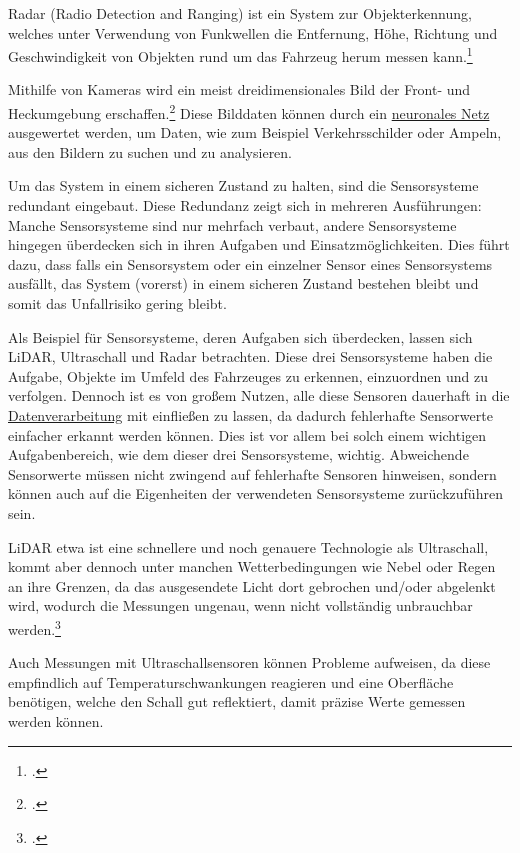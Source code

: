 \documentclass[a4paper, 12pt, openany]{book}
\begin{document}
                Radar (Radio Detection and Ranging) ist ein System zur Objekterkennung, welches unter Verwendung von Funkwellen die Entfernung, Höhe, Richtung und Geschwindigkeit von Objekten rund um das Fahrzeug herum messen kann.\footcite[37]{rathod2013autonomous}
                
                Mithilfe von Kameras wird ein meist dreidimensionales Bild der Front- und Heckumgebung erschaffen.\footcite[37]{rathod2013autonomous} Diese Bilddaten können durch ein \hyperref[dv]{neuronales Netz} ausgewertet werden, um Daten, wie zum Beispiel Verkehrsschilder oder Ampeln, aus den Bildern zu suchen und zu analysieren. 
                
                Um das System in einem sicheren Zustand zu halten, sind die Sensorsysteme redundant eingebaut. Diese Redundanz zeigt sich in mehreren Ausführungen: Manche Sensorsysteme sind nur mehrfach verbaut, andere Sensorsysteme hingegen überdecken sich in ihren Aufgaben und Einsatzmöglichkeiten. Dies führt dazu, dass falls ein Sensorsystem oder ein einzelner Sensor eines Sensorsystems ausfällt, das System (vorerst) in einem sicheren Zustand bestehen bleibt und somit das Unfallrisiko gering bleibt.  
                
                Als Beispiel für Sensorsysteme, deren Aufgaben sich überdecken, lassen sich LiDAR, Ultraschall und Radar betrachten. Diese drei Sensorsysteme haben die Aufgabe, Objekte im Umfeld des Fahrzeuges zu erkennen, einzuordnen und zu verfolgen. Dennoch ist es von großem Nutzen, alle diese Sensoren dauerhaft in die \hyperref[dv]{Datenverarbeitung} mit einfließen zu lassen, da dadurch fehlerhafte Sensorwerte einfacher erkannt werden können. Dies ist vor allem bei solch einem wichtigen Aufgabenbereich, wie dem dieser drei Sensorsysteme, wichtig.
                Abweichende Sensorwerte müssen nicht zwingend auf fehlerhafte Sensoren hinweisen, sondern können auch auf die Eigenheiten der verwendeten Sensorsysteme zurückzuführen sein.
                
                LiDAR etwa ist eine schnellere und noch genauere Technologie als Ultraschall, kommt aber dennoch unter manchen Wetterbedingungen wie Nebel oder Regen an ihre Grenzen, da das ausgesendete Licht dort gebrochen und/oder abgelenkt wird, wodurch die Messungen ungenau, wenn nicht vollständig unbrauchbar werden.\footcite[1695]{kutila2018automotive}
                
                Auch Messungen mit Ultraschallsensoren können Probleme aufweisen, da diese empfindlich auf Temperaturschwankungen reagieren und eine Oberfläche benötigen, welche den Schall gut reflektiert, damit präzise Werte gemessen werden können.
                
\end{document}
